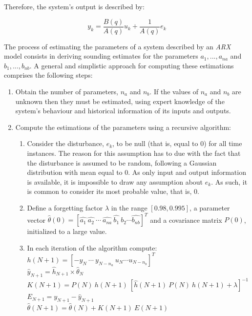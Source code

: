 \documentclass[11pt]{article}
\begin{document}
Therefore, the system's output is described by:

$$y_{k} = \frac{B(q)}{A(q)} u_{k} + \frac{1}{A(q)} e_{k} $$

The process of estimating the parameters of a system described by an \emph{ARX} model consists in deriving sounding estimates for the parameters $a_{1}, ... , a_{na}$ and $b_{1}, ... , b_{nb}$. A general and simplistic approach for computing these estimations comprises the following steps:

\begin{enumerate}
	\item Obtain the number of parameters, $n_{a}$ and $n_{b}$. If the values of $n_{a}$ and $n_{b}$ are unknown then they must be estimated, using expert knowledge of the system's behaviour and historical information of its inputs and outputs.
	
	\item Compute the estimations of the parameters using a recursive algorithm:
	\begin{enumerate}
		\item Consider the disturbance, $e_{k}$, to be null (that is, equal to 0) for all time instances. The reason for this assumption has to due with the fact that the disturbance is assumed to be random, following a Gaussian distribution with mean equal to 0. As only input and output information is available, it is impossible to draw any assumption about $e_{k}$. As such, it is common to consider its most probable value, that is, 0.
		
		\item Define a forgetting factor $\lambda$ in the range $[0.98, 0.995]$, a parameter vector $\hat{\theta}(0) = [\hat{a_{1}} \: \hat{a_{2}} \: \cdots \: \hat{a_{na}} \: \hat{b_{1}} \: \hat{b_{2}} \cdots \hat{b_{nb}}]^{T}$ and a covariance matrix $P(0)$, initialized to a large value.
		
		\item In each iteration of the algorithm compute: \\ $h(N+1) = [-y_{N} \: \cdots \: y_{N-n_{a}} \: u_{N} \cdots u_{N-n_{b}}]^{T}$ \\ $\hat{y}_{N+1} = \hat{h}_{N+1} \times \hat{\theta}_{N}$\\ $K(N+1) = P(N) \: h(N+1) \: [\hat{h}(N+1) \: P(N) \: h(N+1) + \lambda]^{-1}$\\ $E_{N+1} = y_{N+1} - \hat{y}_{N+1}$\\ $\hat{\theta}(N+1) = \hat{\theta}(N) + K(N+1) \: E(N+1)$
	\end{enumerate}
\end{enumerate}
\end{document}
